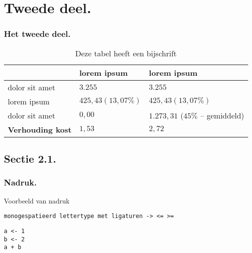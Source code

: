 \documentclass[aspectratio=169]{beamer}
\begin{document}
\section{Tweede deel.}

\begin{frame}
  \frametitle{Het tweede deel.}
  
  \begin{table}
    \begin{tabular}{lll}
      \toprule
      & \textbf{lorem ipsum} & \textbf{lorem ipsum} \\
      \midrule
      dolor sit amet & $3.255$ & $3.255$ \\
      \midrule
      lorem ipsum & $425,43 (13,07\%)$ & $425,43 (13,07\%)$ \\
      \midrule
      dolor sit amet & $0,00$ & $1.273,31$ ($45\%$ -- gemiddeld) \\
      \midrule
      \textbf{{\small Verhouding kost}} & \textbf{$1,53$} & \textbf{$2,72$}\\
      \bottomrule
    \end{tabular}
    
    \label{tab:voorbeeld}
    \caption{Deze tabel heeft een bijschrift}
  \end{table}
\end{frame}

\subsection{Sectie 2.1.}

\begin{frame}[fragile]
  \frametitle{Nadruk.}

  Voorbeeld van \alert{nadruk}
  


\end{frame}

\begin{frame}[fragile]
  \texttt{monogespatieerd lettertype met ligaturen -> <= >=}

\begin{verbatim}
a <- 1
b <- 2
a + b
\end{verbatim}
\end{frame}

\end{document}
